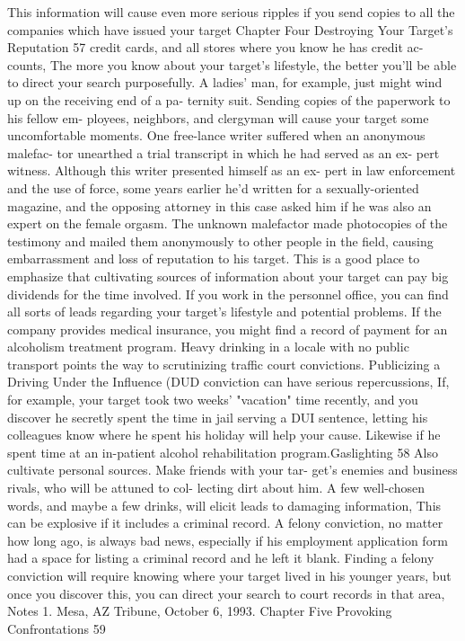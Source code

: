 \documentclass{book}
\begin{document}
This information will cause even more serious ripples if you 
send copies to all the companies which have issued your target 
Chapter Four 
Destroying Your Target's Reputation 
57 
credit cards, and all stores where you know he has credit ac- 
counts, 
The more you know about your target's lifestyle, the better 
you'll be able to direct your search purposefully. A ladies' man, 
for example, just might wind up on the receiving end of a pa- 
ternity suit. Sending copies of the paperwork to his fellow em- 
ployees, neighbors, and clergyman will cause your target some 
uncomfortable moments. 
One free-lance writer suffered when an anonymous malefac- 
tor unearthed a trial transcript in which he had served as an ex- 
pert witness. Although this writer presented himself as an ex- 
pert in law enforcement and the use of force, some years earlier 
he'd written for a sexually-oriented magazine, and the opposing 
attorney in this case asked him if he was also an expert on the 
female orgasm. The unknown malefactor made photocopies of 
the testimony and mailed them anonymously to other people in 
the field, causing embarrassment and loss of reputation to his 
target. 
This is a good place to emphasize that cultivating sources of 
information about your target can pay big dividends for the 
time involved. If you work in the personnel office, you can find 
all sorts of leads regarding your target's lifestyle and potential 
problems. If the company provides medical insurance, you 
might find a record of payment for an alcoholism treatment 
program. 
Heavy drinking in a locale with no public transport points 
the way to scrutinizing traffic court convictions. Publicizing a 
Driving Under the Influence (DUD conviction can have serious 
repercussions, If, for example, your target took two weeks’ 
"vacation" time recently, and you discover he secretly spent the 
time in jail serving a DUI sentence, letting his colleagues know 
where he spent his holiday will help your cause. Likewise if he 
spent time at an in-patient alcohol rehabilitation program.Gaslighting 
58 
Also cultivate personal sources. Make friends with your tar- 
get's enemies and business rivals, who will be attuned to col- 
lecting dirt about him. A few well-chosen words, and maybe a 
few drinks, will elicit leads to damaging information, This can 
be explosive if it includes a criminal record. 
A felony conviction, no matter how long ago, is always bad 
news, especially if his employment application form had a 
space for listing a criminal record and he left it blank. Finding a 
felony conviction will require knowing where your target lived 
in his younger years, but once you discover this, you can direct 
your search to court records in that area, 
Notes 
1. Mesa, AZ Tribune, October 6, 1993. 
Chapter Five 
Provoking Confrontations 
59 
\end{document}

